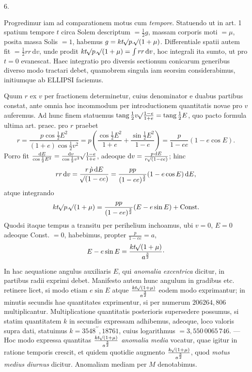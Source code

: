 \begin{center}
6.
\end{center}
Progredimur iam ad comparationem motus cum \emph{tempore}. Statuendo ut in art. 1
spatium tempore $t$ circa Solem descriptum $= \frac{1}{2}g$, massam corporis moti $= \mu$,
posita massa Solis $= 1$, habemus $g = kt\mathord{{}^{}\!\surd}p.\mathord{{}^{}\!\surd}(1+\mu)$. Differentiale
spatii autem fit $= \frac{1}{2}rr\,\mathrm{d}v$, unde prodit $kt\mathord{{}^{}\!\surd}p.\mathord{{}^{}\!\surd}(1+\mu)
= \int rr\,\mathrm{d}v$, hoc integrali ita sumto, ut pro $t=0$ evanescat. Haec integratio
pro diversis sectionum conicarum generibus diverso modo tractari debet, quamobrem
singula iam seorsim considerabimus, initiumque ab ELLIPSI faciemus.

Quum $r$ ex $v$ per fractionem determinetur, cuius denominator e duabus partibus
constat, ante omnia hoc incommodum per introductionem quantitatis novae pro $v$
auferemus. Ad hunc finem statuemus $\operatorname{tang}\frac{1}{2}v\mathord{{}^{}\!\surd}\frac{1-e}{1+e}
= \operatorname{tang}\frac{1}{2}E$, quo pacto formula ultima art. praec. pro $r$ praebet
\[
r = \frac{p\cos\frac{1}{2}E^2}{(1+e)\cos\frac{1}{2}v^2} = p\left(\frac{\cos\frac{1}{2}E^2}{1+e}+\frac{\sin\frac{1}{2}E^2}{1-e}\right) = \frac{p}{1-ee}(1-e\cos E).
\]
Porro fit $\frac{\mathrm{d}E}{\cos\frac{1}{2}E^2} = \frac{\mathrm{d}v}{\cos\frac{1}{2}v^2}\mathord{{}^{}\!\surd}\frac{1-e}{1+e}$,
adeoque $\mathrm{d}v = \frac{p\,\mathrm{d}E}{r\mathord{{}^{}\!\surd}(1-ee)}$; hinc
\[
rr\,\mathrm{d}v = \frac{r\,\grave{p}\,\mathrm{d}E}{\mathord{{}^{}\!\surd}(1-ee)} = \frac{pp}{(1-ee)^{\frac{3}{2}}}(1-e\cos E)\,\mathrm{d}E,
\]
atque integrando
\[
kt\mathord{{}^{}\!\surd}p.\mathord{{}^{}\!\surd}(1+\mu) = \frac{pp}{(1-ee)^{\frac{3}{2}}}(E-e\sin E)+\mathrm{Const.}
\]
Quodsi itaque tempus a transitu per perihelium inchoamus, ubi $v=0$, $E=0$
adeoque Const. $= 0$, habebimus, propter $\frac{p}{1-ee}=a$,
\[
E-e\sin E = \frac{kt\mathord{{}^{}\!\surd}(1+\mu)}{a^{\frac{3}{2}}}\cdot
\]

In hac aequatione angulus auxiliaris $E$, qui \emph{anomalia excentrica} dicitur, in
partibus radii exprimi debet. Manifesto autem hunc angulum in gradibus etc. retinere
licet, si modo etiam $e\sin E$ atque $\frac{kt\mathord{{}^{}\!\surd}(1+\mu)}{a^{\frac{3}{2}}}$ eodem modo
exprimantur; in minutis secundis hae quantitates exprimentur, si per numerum
$206264{,}806$ multiplicantur. Multiplicatione quantitatis posterioris supersedere
possumus, si statim quantitatem $k$ in secundis expressam adhibemus, adeoque, loco
valoris supra dati, statuimus $k = 3548^{\prime\prime}{,}18761$, cuius logarithmus $= 3{,}550\,0065\,746$. —
Hoc modo expressa quantitas $\frac{kt\mathord{{}^{}\!\surd}(1+\mu)}{a^{\frac{3}{2}}}$ \emph{anomalia
media} vocatur, quae igitur in ratione temporis crescit, et quidem quotidie augmento
$\frac{k\mathord{{}^{}\!\surd}(1+\mu)}{a^{\frac{3}{2}}}$, quod \emph{motus medius diurnus} dicitur.
Anomaliam mediam per $M$ denotabimus.
